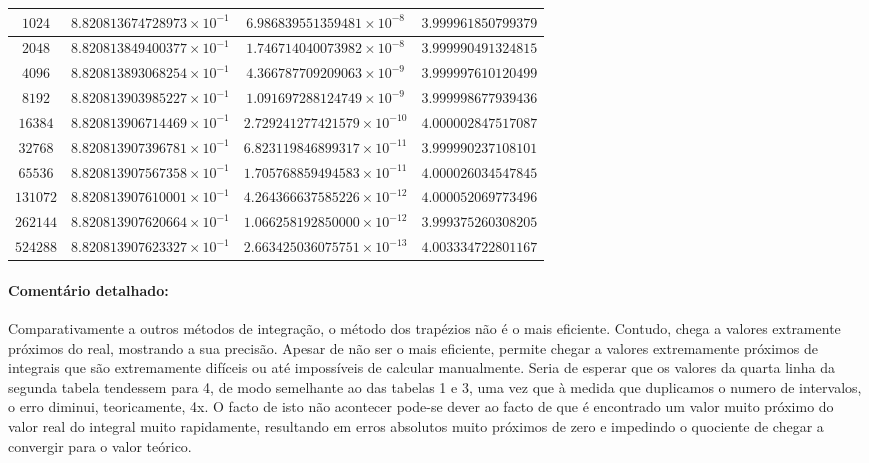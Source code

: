 \documentclass[a4paper,10pt]{extarticle}
\begin{document}
\begin{enumerate}
\begin{enumerate}
\begin{center}
{\begin{tabular}{|c|c|c|c|}
\hline
$1024$&$8.820813674728973\times 10^{-1}$&$6.986839551359481\times 10^{-8}$&$3.999961850799379$\\
\hline
$2048$&$8.820813849400377\times 10^{-1}$&$1.746714040073982\times 10^{-8}$&$3.999990491324815$\\
\hline
$4096$&$8.820813893068254\times 10^{-1}$&$4.366787709209063\times 10^{-9}$&$3.999997610120499$\\
\hline
$8192$&$8.820813903985227\times 10^{-1}$&$1.091697288124749\times 10^{-9}$&$3.999998677939436$\\
\hline
$16384$&$8.820813906714469\times 10^{-1}$&$2.729241277421579\times 10^{-10}$&$4.000002847517087$\\
\hline
$32768$&$8.820813907396781\times 10^{-1}$&$6.823119846899317\times 10^{-11}$&$3.999990237108101$\\
\hline
$65536$&$8.820813907567358\times 10^{-1}$&$1.705768859494583\times 10^{-11}$&$4.000026034547845$\\
\hline
$131072$&$8.820813907610001\times 10^{-1}$&$4.264366637585226\times 10^{-12}$&$4.000052069773496$\\
\hline
$262144$&$8.820813907620664\times 10^{-1}$&$1.066258192850000\times 10^{-12}$&$3.999375260308205$\\
\hline
$524288$&$8.820813907623327\times 10^{-1}$&$2.663425036075751\times 10^{-13}$&$4.003334722801167$\\
\hline
\end{tabular}}
\end{center}

\paragraph{Comentário detalhado:}

Comparativamente a outros métodos de integração, o método dos trapézios não é o mais eficiente. Contudo, chega a valores extramente próximos do real, mostrando a sua precisão. Apesar de não ser o mais eficiente, permite chegar a valores extremamente próximos de integrais que são extremamente difíceis ou até impossíveis de calcular manualmente. Seria de esperar que os valores da quarta linha da segunda tabela tendessem para 4, de modo semelhante ao das tabelas 1 e 3, uma vez que à medida que duplicamos o numero de intervalos, o erro diminui, teoricamente, 4x. O facto de isto não acontecer pode-se dever ao facto de que é encontrado um valor muito próximo do valor real do integral muito rapidamente, resultando em erros absolutos muito próximos de zero e impedindo o quociente de chegar a convergir para o valor teórico.


\end{enumerate}
\end{enumerate}
\end{document}

